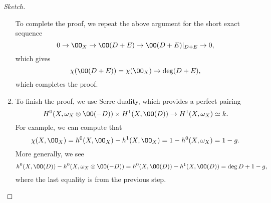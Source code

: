 \documentclass[../notes.tex]{subfiles}
\begin{document}
\begin{proof}[Sketch]
\begin{enumerate}
		To complete the proof, we repeat the above argument for the short exact sequence
		\[0\to\OO_X\to\OO(D+E)\to\OO(D+E)|_{D+E}\to0,\]
		which gives
		\[\chi(\OO(D+E))=\chi(\OO_X)\to\deg(D+E),\]
		which completes the proof.

		\item To finish the proof, we use Serre duality, which provides a perfect pairing
		\[H^0(X,\omega_X\otimes\OO(-D))\times H^1(X,\OO(D))\to H^1(X,\omega_X)\simeq k.\]
		For example, we can compute that
		\[\chi(X,\OO_X)=h^0(X,\OO_X)-h^1(X,\OO_X)=1-h^0(X,\omega_X)=1-g.\]
		More generally, we see
		\[h^0(X,\OO(D))-h^0(X,\omega_X\otimes\OO(-D))=h^0(X,\OO(D))-h^1(X,\OO(D))=\deg D+1-g,\]
		where the last equality is from the previous step.
		\qedhere
	\end{enumerate}
\end{proof}
\end{document}

